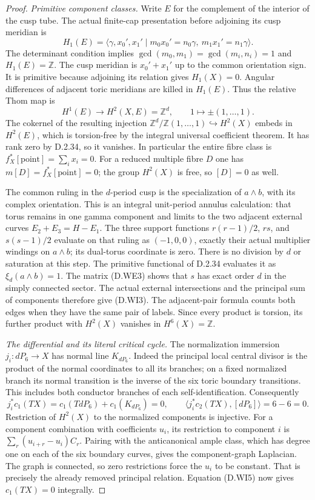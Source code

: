 \begin{proof}
\emph{Primitive component classes.}
Write $E$ for the complement of the interior of the cusp tube.
The actual finite-cap presentation before adjoining its cusp meridian is
\[
 H_1(E)=
 \langle\gamma,x_0',x_1'\mid m_0x_0'=n_0\gamma,\ 
                                   m_1x_1'=n_1\gamma\rangle .
\]
The determinant condition implies
$\gcd(m_0,m_1)=\gcd(m_i,n_i)=1$ and $H_1(E)=\mathbb Z$.
The cusp meridian is $x_0'+x_1'$ up to the common orientation sign.
It is primitive because adjoining its relation gives $H_1(X)=0$.
Angular differences of adjacent toric meridians are killed in
$H_1(E)$.  Thus the relative Thom map is
\[
 H^1(E)\longrightarrow H^2(X,E)=\mathbb Z^d,\qquad
                   1\longmapsto\pm(1,\ldots,1).
 \tag{D.WI4}
\]
The cokernel of the resulting injection
$\mathbb Z^d/\mathbb Z(1,\ldots,1)\hookrightarrow H^2(X)$
embeds in $H^2(E)$, which is torsion-free by the integral universal
coefficient theorem.  It has rank zero by D.2.34, so it vanishes.
In particular the entire fibre class is
$f_X^*[\mathrm{point}]=\sum_i x_i=0$.
For a reduced multiple fibre $D$ one has
$m[D]=f_X^*[\mathrm{point}]=0$; the group $H^2(X)$ is free,
so $[D]=0$ as well.

The common ruling in the $d$-period cusp is the specialization
of $a\wedge b$, with its complex orientation.  This is an integral
unit-period annulus calculation: that torus remains in one gamma
component and limits to the two adjacent external curves
$E_2+E_3=H-E_1$.  The three support functions
$r(r-1)/2$, $rs$, and $s(s-1)/2$ evaluate on that ruling as
$(-1,0,0)$, exactly their actual multiplier windings on
$a\wedge b$; its dual-torus coordinate is zero.
There is no division by $d$ or saturation at this step.
The primitive functional of D.2.34 evaluates it as
$\xi_d(a\wedge b)=1$.  The matrix (D.WE3) shows that $s$ has
exact order $d$ in the simply connected sector.  The actual
external intersections and the principal sum of components
therefore give (D.WI3).  The adjacent-pair formula counts both
edges when they have the same pair of labels.  Since every
product is torsion, its further product with $H^2(X)$ vanishes
in $H^6(X)=\mathbb Z$.

\emph{The differential and its literal critical cycle.}
The normalization immersion $j_i:dP_6\longrightarrow X$ has
normal line $K_{dP_6}$.  Indeed the principal local central
divisor is the product of the normal coordinates to all its
branches; on a fixed normalized branch its normal transition
is the inverse of the six toric boundary transitions.  This
includes both conductor branches of each self-identification.
Consequently
\[
 j_i^*c_1(TX)=c_1(TdP_6)+c_1(K_{dP_6})=0,\qquad
 \langle j_i^*c_2(TX),[dP_6]\rangle=6-6=0 .
 \tag{D.WI5}
\]
Restriction of $H^2(X)$ to the normalized components is injective.
For a component combination with coefficients $u_i$, its
restriction to component $i$ is
$\sum_r(u_{i+r}-u_i)C_r$.  Pairing with the anticanonical ample
class, which has degree one on each of the six boundary curves,
gives the component-graph Laplacian.  The graph is connected, so
zero restrictions force the $u_i$ to be constant.  That is
precisely the already removed principal relation.  Equation
(D.WI5) now gives $c_1(TX)=0$ integrally.


\end{proof}
